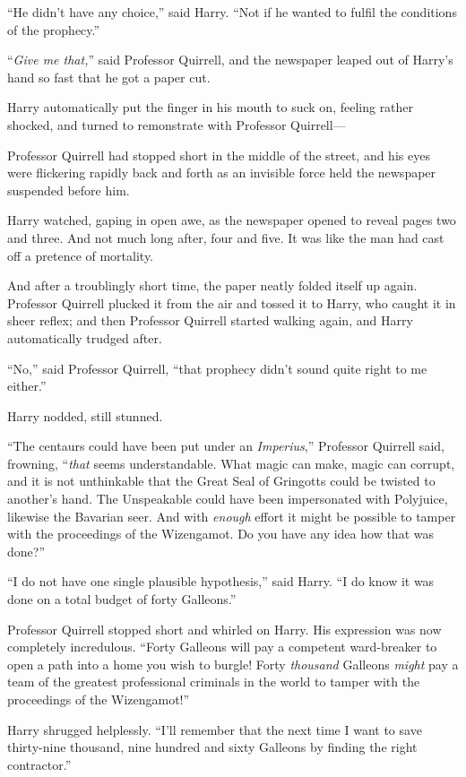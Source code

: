 “He didn’t have any choice,” said Harry. “Not if he wanted to fulfil the conditions of the prophecy.”

“\emph{Give me that,}” said Professor Quirrell, and the newspaper leaped out of Harry’s hand so fast that he got a paper cut.

Harry automatically put the finger in his mouth to suck on, feeling rather shocked, and turned to remonstrate with Professor Quirrell—

Professor Quirrell had stopped short in the middle of the street, and his eyes were flickering rapidly back and forth as an invisible force held the newspaper suspended before him.

Harry watched, gaping in open awe, as the newspaper opened to reveal pages two and three. And not much long after, four and five. It was like the man had cast off a pretence of mortality.

And after a troublingly short time, the paper neatly folded itself up again. Professor Quirrell plucked it from the air and tossed it to Harry, who caught it in sheer reflex; and then Professor Quirrell started walking again, and Harry automatically trudged after.

“No,” said Professor Quirrell, “that prophecy didn’t sound quite right to me either.”

Harry nodded, still stunned.

“The centaurs could have been put under an \emph{Imperius},” Professor Quirrell said, frowning, “\emph{that} seems understandable. What magic can make, magic can corrupt, and it is not unthinkable that the Great Seal of Gringotts could be twisted to another’s hand. The Unspeakable could have been impersonated with Polyjuice, likewise the Bavarian seer. And with \emph{enough} effort it might be possible to tamper with the proceedings of the Wizengamot. Do you have any idea how that was done?”

“I do not have one single plausible hypothesis,” said Harry. “I do know it was done on a total budget of forty Galleons.”

Professor Quirrell stopped short and whirled on Harry. His expression was now completely incredulous. “Forty Galleons will pay a competent ward-breaker to open a path into a home you wish to burgle! Forty \emph{thousand} Galleons \emph{might} pay a team of the greatest professional criminals in the world to tamper with the proceedings of the Wizengamot!”

Harry shrugged helplessly. “I’ll remember that the next time I want to save thirty-nine thousand, nine hundred and sixty Galleons by finding the right contractor.”

